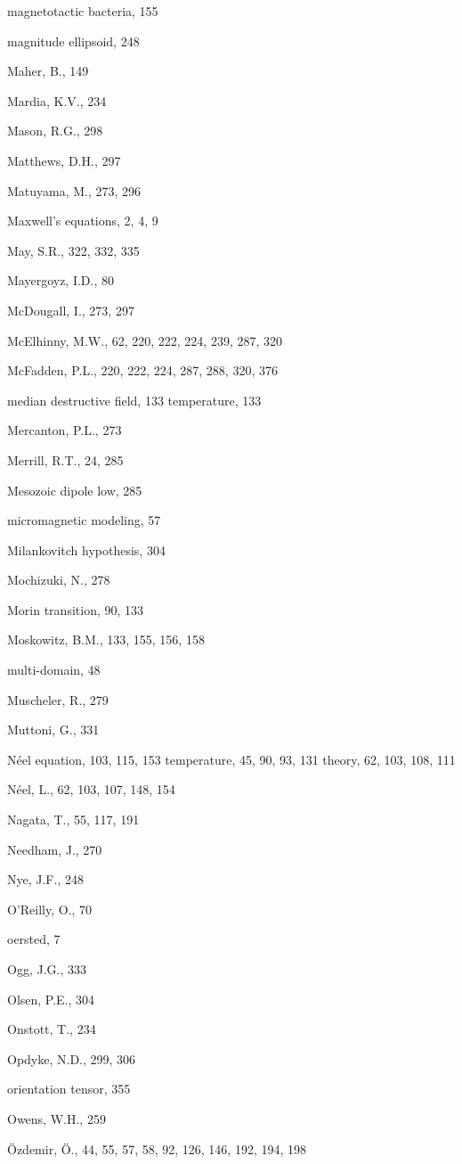 \documentclass[,plain]{tauxe}
\begin{document}
\begin{theindex}
  \item magnetotactic bacteria, 155
  \item magnitude ellipsoid, 248
  \item Maher, B., 149
  \item Mardia, K.V., 234
  \item Mason, R.G., 298
  \item Matthews, D.H., 297
  \item Matuyama, M., 273, 296
  \item Maxwell's equations, 2, 4, 9
  \item May, S.R., 322, 332, 335
  \item Mayergoyz, I.D., 80
  \item McDougall, I., 273, 297
  \item McElhinny, M.W., 62, 220, 222, 224, 239, 287, 320
  \item McFadden, P.L., 220, 222, 224, 287, 288, 320, 376
  \item median destructive
    \subitem field, 133
    \subitem temperature, 133
  \item Mercanton, P.L., 273
  \item Merrill, R.T., 24, 285
  \item Mesozoic dipole low, 285
  \item micromagnetic modeling, 57
  \item Milankovitch hypothesis, 304
  \item Mochizuki, N., 278
  \item Morin transition, 90, 133
  \item Moskowitz, B.M., 133, 155, 156, 158
  \item multi-domain, 48
  \item Muscheler, R., 279
  \item Muttoni, G., 331

  \indexspace

  \item N\'eel
    \subitem equation, 103, 115, 153
    \subitem temperature, 45, 90, 93, 131
    \subitem theory, 62, 103, 108, 111
  \item N\'eel, L., 62, 103, 107, 148, 154
  \item Nagata, T., 55, 117, 191
  \item Needham, J., 270
  \item Nye, J.F., 248

  \indexspace

  \item O'Reilly, O., 70
  \item oersted, 7
  \item Ogg, J.G., 333
  \item Olsen, P.E., 304
  \item Onstott, T., 234
  \item Opdyke, N.D., 299, 306
  \item orientation tensor, 355
  \item Owens, W.H., 259
  \item \"Ozdemir, \"O., 44, 55, 57, 58, 92, 126, 146, 192, 194, 198


\end{theindex}
\end{document}
